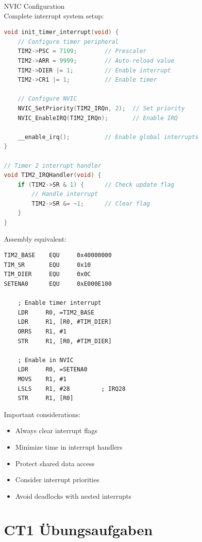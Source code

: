 \begin{example2}{NVIC Configuration}\\
Complete interrupt system setup:

\begin{lstlisting}[language=C, style=basesmol]
void init_timer_interrupt(void) {
    // Configure timer peripheral
    TIM2->PSC = 7199;        // Prescaler
    TIM2->ARR = 9999;        // Auto-reload value
    TIM2->DIER |= 1;         // Enable interrupt
    TIM2->CR1 |= 1;          // Enable timer
    
    // Configure NVIC
    NVIC_SetPriority(TIM2_IRQn, 2);  // Set priority
    NVIC_EnableIRQ(TIM2_IRQn);       // Enable IRQ
    
    __enable_irq();          // Enable global interrupts
}

// Timer 2 interrupt handler
void TIM2_IRQHandler(void) {
    if (TIM2->SR & 1) {      // Check update flag
        // Handle interrupt
        TIM2->SR &= ~1;      // Clear flag
    }
}
\end{lstlisting}

Assembly equivalent:
\begin{lstlisting}[language=armasm, style=basesmol]
TIM2_BASE    EQU     0x40000000
TIM_SR       EQU     0x10
TIM_DIER     EQU     0x0C
SETENA0      EQU     0xE000E100

    ; Enable timer interrupt
    LDR     R0, =TIM2_BASE
    LDR     R1, [R0, #TIM_DIER]
    ORRS    R1, #1
    STR     R1, [R0, #TIM_DIER]
    
    ; Enable in NVIC
    LDR     R0, =SETENA0
    MOVS    R1, #1
    LSLS    R1, #28         ; IRQ28
    STR     R1, [R0]
\end{lstlisting}
\end{example2}

\begin{remark}
Important considerations:
\begin{itemize}
  \item Always clear interrupt flags
  \item Minimize time in interrupt handlers
  \item Protect shared data access
  \item Consider interrupt priorities
  \item Avoid deadlocks with nested interrupts
\end{itemize}
\end{remark}

\section*{CT1 Übungsaufgaben}
